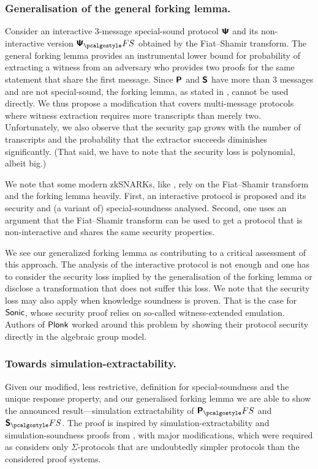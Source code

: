 \documentclass[runningheads,11pt]{llncs}
\theoremstyle{definition} \newtheorem{definition}[theorem]{Definition}
\begin{document}
\subsubsection{Generalisation of the general forking lemma.}
Consider an interactive $3$-message special-sound protocol $\bm{\mathsf{\Psi}}$ and its
non-interactive version $\ps_\fs$ obtained by the Fiat--Shamir transform. The
general forking lemma provides an instrumental lower bound for probability of
extracting a witness from an adversary who provides two proofs for the same
statement that share the first message. Since $\bm{\mathsf{P}}$ and $\bm{\mathsf{S}}$ have
more than $3$ messages and are not special-sound, the forking lemma, as stated
in \cite{CCS:BelNev06}, cannot be used directly. We thus propose a modification
that covers multi-message protocols where witness extraction requires more
transcripts than merely two.  Unfortunately, we also observe that the security
gap grows with the number of transcripts and the probability that the extractor
succeeds diminishes significantly. (That said, we have to note that the security
loss is polynomial, albeit big.)

We note that some modern zkSNARKs, like \cite{SP:BBBPWM18,CCS:MBKM19}, rely on
the Fiat--Shamir transform and the forking lemma heavily. First, an interactive
protocol is proposed and its security and (a variant of) special-soundness analysed. Second,
one uses an argument that the Fiat--Shamir transform can be used to get a
protocol that is non-interactive and shares the same security properties.

  
We see our generalized forking lemma as contributing to a critical assessment of
this approach. The analysis of the interactive protocol is not enough and one
has to consider the security loss implied by the generalisation of the forking
lemma or disclose a transformation that does not suffer this loss. We note that the security loss may also apply when knowledge
soundness is proven. That is the case for ${\textnormal{\textsf{Sonic}}}$, whose security proof relies
on so-called witness-extended emulation. Authors of $\textnormal{\textsf{Plonk}}$ worked around this
problem by showing their protocol security directly in the algebraic group model.

\subsubsection{Towards simulation-extractability.} Given our modified, less
restrictive, definition for special-soundness and the unique response property,
and our generalised forking lemma we are able to show the announced
result---simulation extractability of $\plonkprotfs$ and $\sonicprotfs$. The
proof is inspired by simulation-extractability and simulation-soundness proofs
from \cite{INDOCRYPT:FKMV12}, with major modifications, which were required as
\cite{INDOCRYPT:FKMV12} considers only $\Sigma$-protocols
that are undoubtedly simpler protocols than the considered proof systems.
\end{document}
